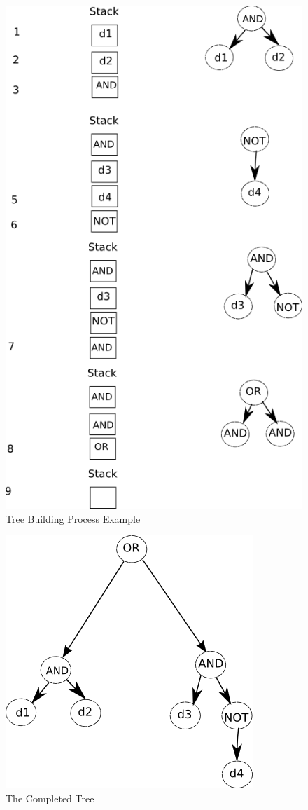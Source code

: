 \documentclass[10pt, a4paper, titlepage]{article}
\begin{document}
\begin{figure}[h]
\centering
\includegraphics[scale=0.5]{images/tree.png}
\caption{Tree Building Process Example}
\label{fig:tree}
\end{figure}


\begin{figure}[h]
\centering
\includegraphics[scale=0.5]{images/tree2.png}
\caption{The Completed Tree}
\label{fig:tree2}
\end{figure}
\end{document}
